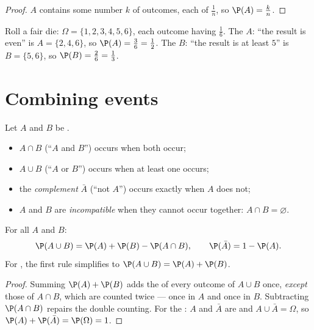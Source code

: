 \begin{proof}
$A$ contains some number $k$ of outcomes, each of  $\frac1n$,
so $\P(A) = \frac kn$.
\end{proof}

\begin{example}\label{ex:g10:proba:die}
Roll a fair die: $\Omega = \{1, 2, 3, 4, 5, 6\}$, each outcome having
 $\frac16$. The  $A$: ``the result is even'' is
$A = \{2, 4, 6\}$, so $\P(A) = \frac36 = \frac12$. The  $B$: ``the
result is at least $5$'' is $B = \{5, 6\}$, so $\P(B) = \frac26 =
\frac13$.
\end{example}

\section{Combining events}

\begin{definition}\label{def:g10:proba:operations}
Let $A$ and $B$ be .
\begin{itemize}
  \item $A \cap B$ (``$A$ and $B$'') occurs when both occur;
  \item $A \cup B$ (``$A$ or $B$'') occurs when at least one occurs;
  \item the \emph{complement} $\bar A$ (``not $A$'')
        occurs exactly when $A$ does not;
  \item $A$ and $B$ are \emph{incompatible} when they cannot occur
        together: $A \cap B = \varnothing$.
\end{itemize}
\end{definition}

\begin{theorem}\label{thm:g10:proba:addition}
For all  $A$ and $B$:
\[
\P(A \cup B) = \P(A) + \P(B) - \P(A \cap B),
\qquad
\P(\bar A) = 1 - \P(A) .
\]
For  , the first rule simplifies to
$\P(A \cup B) = \P(A) + \P(B)$.
\end{theorem}

\begin{proof}
Summing $\P(A) + \P(B)$ adds the  of every outcome of
$A \cup B$ once, \emph{except} those of $A \cap B$, which are counted
twice --- once in $A$ and once in $B$. Subtracting $\P(A \cap B)$ repairs
the double counting. For the : $A$ and $\bar A$ are 
and $A \cup \bar A = \Omega$, so $\P(A) + \P(\bar A) = \P(\Omega) = 1$.
\end{proof}

